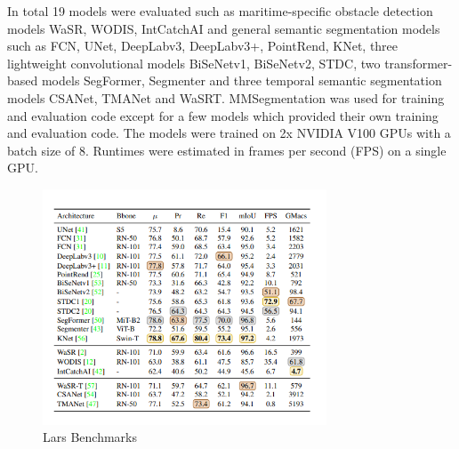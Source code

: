 In total 19 models were evaluated such as maritime-specific obstacle detection models WaSR, WODIS, IntCatchAI and general semantic segmentation models such as FCN, UNet, DeepLabv3, DeepLabv3+, PointRend, KNet, three lightweight convolutional models BiSeNetv1, BiSeNetv2, STDC, two transformer-based models SegFormer, Segmenter and three temporal semantic segmentation models CSANet, TMANet and WaSRT. MMSegmentation was used for training and evaluation code except for a few models which provided their own training and evaluation code. The models were trained on 2x
NVIDIA V100 GPUs with a batch size of 8. Runtimes were
estimated in frames per second (FPS) on a single GPU. 
\begin{figure}[H]
    \centering
    \includegraphics[width=\textwidth,height=7cm,keepaspectratio=true]{src/Images/lars.PNG}
    \caption{
     Lars Benchmarks\cite{Zust_2023_ICCV}
     }
\end{figure}
\\

